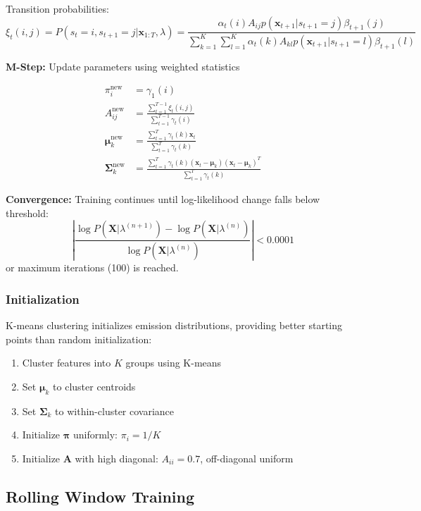 \documentclass[conference]{IEEEtran}
\begin{document}
Transition probabilities:
\begin{equation}
\xi_t(i,j) = P(s_t=i, s_{t+1}=j | \mathbf{x}_{1:T}, \lambda) = \frac{\alpha_t(i)A_{ij}p(\mathbf{x}_{t+1}|s_{t+1}=j)\beta_{t+1}(j)}{\sum_{k=1}^{K}\sum_{l=1}^{K}\alpha_t(k)A_{kl}p(\mathbf{x}_{t+1}|s_{t+1}=l)\beta_{t+1}(l)}
\end{equation}

\textbf{M-Step:} Update parameters using weighted statistics

\begin{align}
\pi_i^{\text{new}} &= \gamma_1(i) \\
A_{ij}^{\text{new}} &= \frac{\sum_{t=1}^{T-1}\xi_t(i,j)}{\sum_{t=1}^{T-1}\gamma_t(i)} \\
\boldsymbol{\mu}_k^{\text{new}} &= \frac{\sum_{t=1}^{T}\gamma_t(k)\mathbf{x}_t}{\sum_{t=1}^{T}\gamma_t(k)} \\
\boldsymbol{\Sigma}_k^{\text{new}} &= \frac{\sum_{t=1}^{T}\gamma_t(k)(\mathbf{x}_t - \boldsymbol{\mu}_k)(\mathbf{x}_t - \boldsymbol{\mu}_k)^T}{\sum_{t=1}^{T}\gamma_t(k)}
\end{align}

\textbf{Convergence:} Training continues until log-likelihood change falls below threshold:
\begin{equation}
\left|\frac{\log P(\mathbf{X}|\lambda^{(n+1)}) - \log P(\mathbf{X}|\lambda^{(n)})}{\log P(\mathbf{X}|\lambda^{(n)})}\right| < 0.0001
\end{equation}
or maximum iterations (100) is reached.

\subsubsection{Initialization}
K-means clustering initializes emission distributions, providing better starting points than random initialization:
\begin{enumerate}
\item Cluster features into $K$ groups using K-means
\item Set $\boldsymbol{\mu}_k$ to cluster centroids
\item Set $\boldsymbol{\Sigma}_k$ to within-cluster covariance
\item Initialize $\boldsymbol{\pi}$ uniformly: $\pi_i = 1/K$
\item Initialize $\mathbf{A}$ with high diagonal: $A_{ii} = 0.7$, off-diagonal uniform
\end{enumerate}

\subsection{Rolling Window Training}
\end{document}
